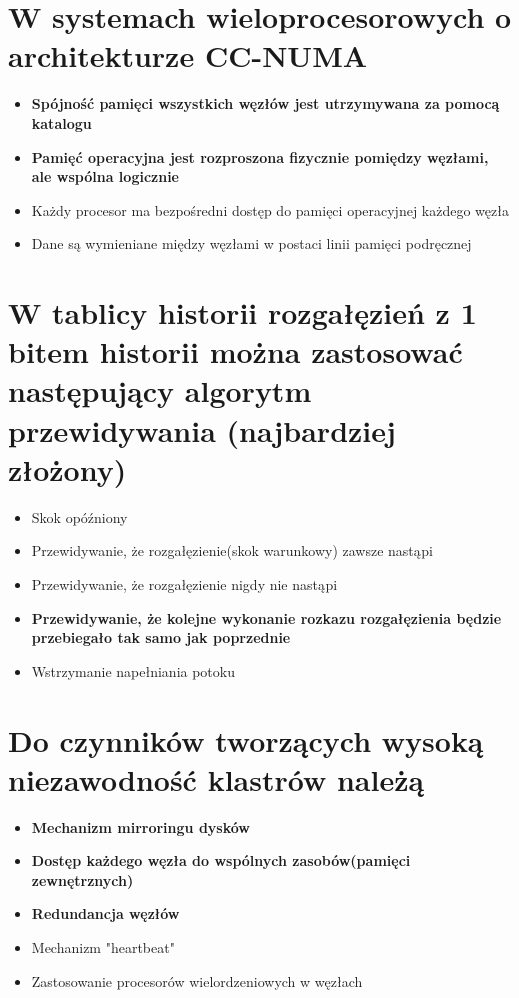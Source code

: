 \documentclass[a4paper,twoside]{article}
\begin{document}
\section{W systemach wieloprocesorowych o architekturze CC-NUMA}
	\begin{itemize}
    \item \textbf{Spójność pamięci wszystkich węzłów jest utrzymywana za pomocą katalogu}
    \item \textbf{Pamięć operacyjna jest rozproszona fizycznie pomiędzy węzłami, ale wspólna logicznie}
    \item Każdy procesor ma bezpośredni dostęp do pamięci operacyjnej każdego węzła
    \item Dane są wymieniane między węzłami w postaci linii pamięci podręcznej
    \end{itemize}

\section{W tablicy historii rozgałęzień z 1 bitem historii można zastosować następujący algorytm przewidywania (najbardziej złożony)}
	\begin{itemize}
    \item Skok opóźniony
    \item Przewidywanie, że rozgałęzienie(skok warunkowy) zawsze nastąpi
    \item Przewidywanie, że rozgałęzienie nigdy nie nastąpi
    \item \textbf{Przewidywanie, że kolejne wykonanie rozkazu rozgałęzienia będzie przebiegało tak samo jak poprzednie}
    \item Wstrzymanie napełniania potoku
    \end{itemize}

\section{Do czynników tworzących wysoką niezawodność klastrów należą}
	\begin{itemize}
    \item \textbf{Mechanizm mirroringu dysków}
    \item \textbf{Dostęp każdego węzła do wspólnych zasobów(pamięci zewnętrznych)}
    \item \textbf{Redundancja węzłów}
    \item Mechanizm "heartbeat"
    \item Zastosowanie procesorów wielordzeniowych w węzłach
    \end{itemize}
\end{document}
